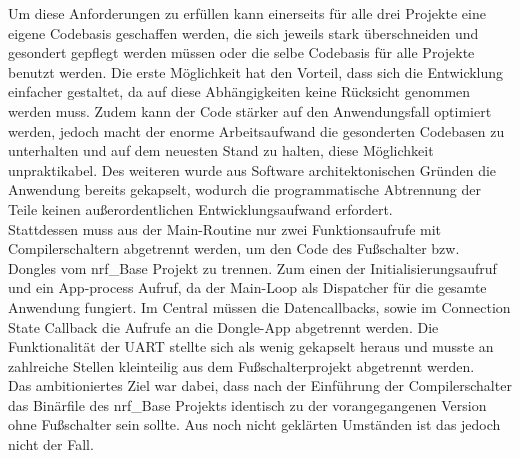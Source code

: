 Um diese Anforderungen zu erfüllen kann einerseits für alle drei Projekte eine eigene Codebasis geschaffen werden, die sich jeweils stark überschneiden und gesondert gepflegt werden müssen oder die selbe Codebasis für alle Projekte benutzt werden. Die erste Möglichkeit hat den Vorteil, dass sich die Entwicklung einfacher gestaltet, da auf diese Abhängigkeiten keine Rücksicht genommen werden muss. Zudem kann der Code stärker auf den Anwendungsfall optimiert werden, jedoch macht der enorme Arbeitsaufwand die gesonderten Codebasen zu unterhalten und auf dem neuesten Stand zu halten, diese Möglichkeit unpraktikabel. Des weiteren wurde aus Software architektonischen Gründen die Anwendung bereits gekapselt, wodurch die programmatische Abtrennung der Teile keinen außerordentlichen Entwicklungsaufwand erfordert.\\
Stattdessen muss aus der Main-Routine nur zwei Funktionsaufrufe mit Compilerschaltern abgetrennt werden, um den Code des Fußschalter bzw. Dongles vom nrf\_Base Projekt zu trennen. Zum einen der Initialisierungsaufruf und ein App-process Aufruf, da der Main-Loop als Dispatcher für die gesamte Anwendung fungiert. Im Central müssen die Datencallbacks, sowie im Connection State Callback die Aufrufe an die Dongle-App abgetrennt werden. Die Funktionalität der \ac{UART} stellte sich als wenig gekapselt heraus und musste an zahlreiche Stellen kleinteilig aus dem Fußschalterprojekt abgetrennt werden.\\ 
Das ambitioniertes Ziel war dabei, dass nach der Einführung der Compilerschalter das Binärfile des nrf\_Base Projekts identisch zu der vorangegangenen Version ohne Fußschalter sein sollte. Aus noch nicht geklärten Umständen ist das jedoch nicht der Fall.


